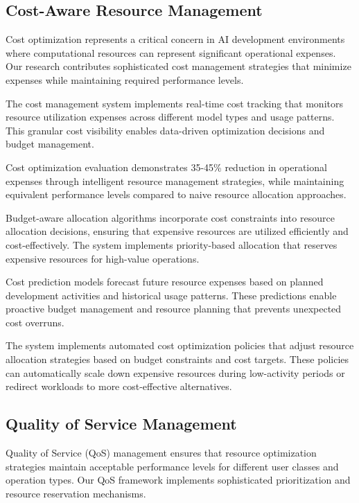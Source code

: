 \subsection*{Cost-Aware Resource Management}

Cost optimization represents a critical concern in AI development environments where computational resources can represent significant operational expenses. Our research contributes sophisticated cost management strategies that minimize expenses while maintaining required performance levels.

The cost management system implements real-time cost tracking that monitors resource utilization expenses across different model types and usage patterns. This granular cost visibility enables data-driven optimization decisions and budget management.

\begin{alertbox}
Cost optimization evaluation demonstrates 35-45\% reduction in operational expenses through intelligent resource management strategies, while maintaining equivalent performance levels compared to naive resource allocation approaches.
\end{alertbox}

Budget-aware allocation algorithms incorporate cost constraints into resource allocation decisions, ensuring that expensive resources are utilized efficiently and cost-effectively. The system implements priority-based allocation that reserves expensive resources for high-value operations.

Cost prediction models forecast future resource expenses based on planned development activities and historical usage patterns. These predictions enable proactive budget management and resource planning that prevents unexpected cost overruns.

The system implements automated cost optimization policies that adjust resource allocation strategies based on budget constraints and cost targets. These policies can automatically scale down expensive resources during low-activity periods or redirect workloads to more cost-effective alternatives.

\subsection*{Quality of Service Management}

Quality of Service (QoS) management ensures that resource optimization strategies maintain acceptable performance levels for different user classes and operation types. Our QoS framework implements sophisticated prioritization and resource reservation mechanisms.

